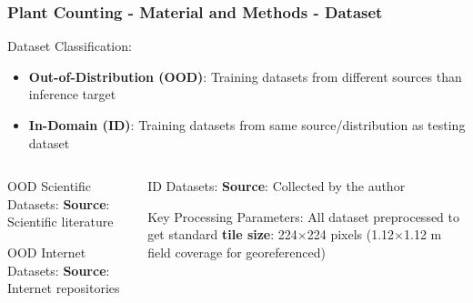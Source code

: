 \documentclass[aspectratio=43]{beamer}
\begin{document}
\begin{frame}
    \frametitle{Plant Counting - Material and Methods - Dataset}
    
    \begin{block}{Dataset Classification:}
        \small
        \begin{itemize}
            \item \textbf{Out-of-Distribution (OOD)}: Training datasets from different sources than inference target
            \item \textbf{In-Domain (ID)}: Training datasets from same source/distribution as testing dataset
        \end{itemize}
    \end{block}
    
    \begin{columns}
        \begin{column}{0.5\textwidth}
            \begin{block}{OOD Scientific Datasets:}
                    \textbf{Source}: Scientific literature
            \end{block}
            
            \begin{block}{OOD Internet Datasets:}
                \textbf{Source}: Internet repositories
            \end{block}
        \end{column}
        
        \begin{column}{0.5\textwidth}
            \begin{block}{ID Datasets:}
                \textbf{Source}: Collected by the author
            \end{block}
            
            \begin{exampleblock}{Key Processing Parameters:}
                \scriptsize
                    All dataset preprocessed to get standard \textbf{tile size}: 224\ensuremath{\times}224 pixels (1.12\ensuremath{\times}1.12 m field coverage for georeferenced)
            \end{exampleblock}
        \end{column}
    \end{columns}
\end{frame}
\end{document}
